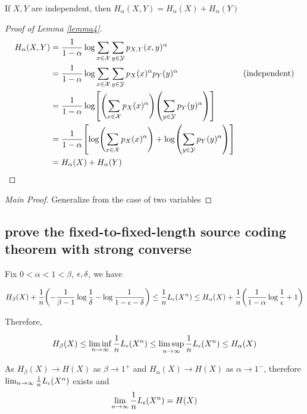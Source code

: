 \documentclass{article}
\begin{document}
\begin{lemma}
\label{lemma4}
If $X, Y$ are independent, then $H_\alpha(X,Y) = H_\alpha(X) + H_\alpha(Y)$
\begin{proof}[Proof of Lemma \ref{lemma4}]
    \begin{align*}
        H_\alpha(X,Y)
        &= \frac{1}{1-\alpha} \log \sum_{x \in \mathcal{X}} \sum_{y \in \mathcal{Y}} p_{X,Y}(x, y)^\alpha \\
        &= \frac{1}{1-\alpha} \log \sum_{x \in \mathcal{X}} \sum_{y \in \mathcal{Y}} p_{X}(x)^\alpha p_Y(y)^\alpha &\text{(independent)}\\
        &= \frac{1}{1-\alpha} \log \bracket*{\tuple*{\sum_{x \in \mathcal{X}} p_{X}(x)^\alpha} \tuple*{\sum_{y \in \mathcal{Y}}  p_Y(y)^\alpha}} \\
        &= \frac{1}{1-\alpha} \bracket*{\log \tuple*{\sum_{x \in \mathcal{X}} p_{X}(x)^\alpha} + \log \tuple*{\sum_{y \in \mathcal{Y}}  p_Y(y)^\alpha}} \\
        &= H_\alpha(X) + H_\alpha(Y)
    \end{align*}
\end{proof}
\end{lemma}

\begin{proof}[Main Proof]
    Generalize from the case of two variables
\end{proof}

\subsection{prove the fixed-to-fixed-length source coding theorem with strong converse}

Fix $0 < \alpha < 1 < \beta$, $\epsilon, \delta$, we have

$$
    H_\beta(X) + \frac{1}{n} \tuple*{- \frac{1}{\beta-1} \log \frac{1}{\delta} - \log \frac{1}{1-\eps-\delta}} \leq \frac{1}{n} L_\eps(X^n) \leq H_\alpha(X) + \frac{1}{n}\tuple*{\frac{1}{1-\alpha} \log \frac{1}{\eps} + 1}
$$

Therefore, 

$$
    H_\beta(X) \leq \liminf_{n \to \infty} \frac{1}{n} L_\epsilon(X^n) \leq \limsup_{n \to \infty} \frac{1}{n} L_\epsilon(X^n) \leq H_\alpha(X)
$$

As $H_\beta(X) \to H(X)$ as $\beta \to 1^+$ and $H_\alpha(X) \to H(X)$ as $\alpha \to 1^-$, therefore $\lim_{n \to \infty} \frac{1}{n} L_\epsilon(X^n)$ exists and 
$$
    \lim_{n \to \infty} \frac{1}{n} L_\epsilon(X^n) = H(X)
$$
\end{document}
